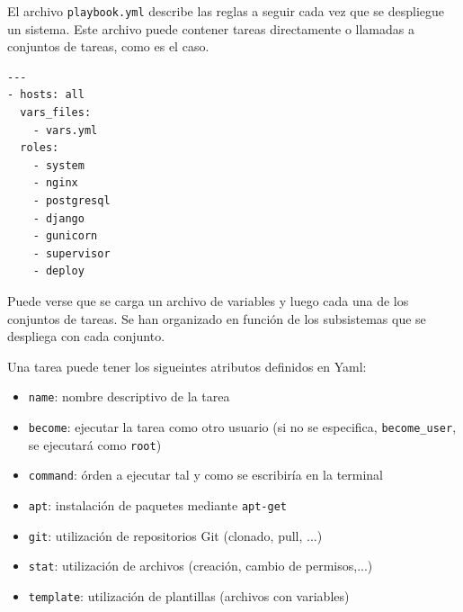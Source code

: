 El archivo \texttt{playbook.yml} describe las reglas a seguir cada vez que se
despliegue un sistema. Este archivo puede contener tareas directamente o
llamadas a conjuntos de tareas, como es el caso.

\begin{verbatim}
---
- hosts: all
  vars_files:
    - vars.yml
  roles:
    - system
    - nginx
    - postgresql
    - django
    - gunicorn
    - supervisor
    - deploy
\end{verbatim}

Puede verse que se carga un archivo de variables y luego cada una de los
conjuntos de tareas. Se han organizado en función de los subsistemas que se
despliega con cada conjunto.

Una tarea puede tener los sigueintes atributos definidos en Yaml:
\begin{itemize}
\item \texttt{name}: nombre descriptivo de la tarea
\item \texttt{become}: ejecutar la tarea como otro usuario (si no se especifica,
  \texttt{become\_user}, se ejecutará como \texttt{root})
\item \texttt{command}: órden a ejecutar tal y como se escribiría en la terminal
\item \texttt{apt}: instalación de paquetes mediante \texttt{apt-get}
\item \texttt{git}: utilización de repositorios Git (clonado, pull, ...)
\item \texttt{stat}: utilización de archivos (creación, cambio de permisos,...)
\item \texttt{template}: utilización de plantillas (archivos con variables)
\end{itemize}

